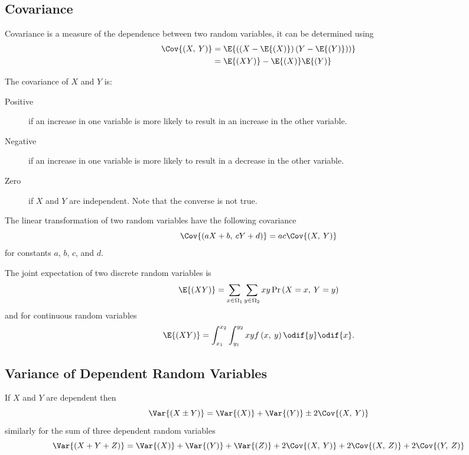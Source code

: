 \documentclass{article}
\begin{document}
\subsection{Covariance}
\begin{definition}[Covariance]
    Covariance is a measure of the dependence between two random variables, it can be determined using
    \begin{align*}
        \Cov{\left( X,\: Y \right)} & = \E{\left( \left( X - \E{\left( X \right)} \right) \left( Y - \E{\left( Y \right)} \right) \right)} \\
                                    & = \E{\left( X Y \right)} - \E{\left( X \right)} \E{\left( Y \right)}
    \end{align*}
\end{definition}
The covariance of \(X\) and \(Y\) is:
\begin{description}
    \item[Positive] if an increase in one variable is more likely to
          result in an increase in the other variable.
    \item[Negative] if an increase in one variable is more likely to
          result in a decrease in the other variable.
    \item[Zero] if \(X\) and \(Y\) are independent. Note that the
          converse is not true.
\end{description}
The linear transformation of two random variables have the following covariance
\begin{equation*}
    \Cov{\left( aX + b,\: cY + d \right)} = ac \Cov{\left( X,\: Y \right)}
\end{equation*}
for constants \(a\), \(b\), \(c\), and \(d\).
\begin{definition}
    The joint expectation of two discrete random variables is
    \begin{equation*}
        \E{\left( X Y \right)} = \sum_{x\in\Omega_1} \sum_{y\in\Omega_2} x y \Pr{\left( X = x,\: Y = y \right)}
    \end{equation*}
    and for continuous random variables
    \begin{equation*}
        \E{\left( X Y \right)} = \int_{x_1}^{x_2} \int_{y_1}^{y_2} x y f\left( x,\: y \right) \odif{y} \odif{x}.
    \end{equation*}
\end{definition}
\subsection{Variance of Dependent Random Variables}
If \(X\) and \(Y\) are dependent then
\begin{equation*}
    \Var{\left( X \pm Y \right)} = \Var{\left( X \right)} + \Var{\left( Y \right)} \pm 2\Cov{\left( X,\: Y \right)}
\end{equation*}
similarly for the sum of three dependent random variables
\begin{equation*}
    \Var{\left( X + Y + Z \right)} = \Var{\left( X \right)} + \Var{\left( Y \right)} + \Var{\left( Z \right)} + 2\Cov{\left( X,\: Y \right)} + 2\Cov{\left( X,\: Z \right)} + 2\Cov{\left( Y,\: Z \right)}
\end{equation*}
\end{document}
